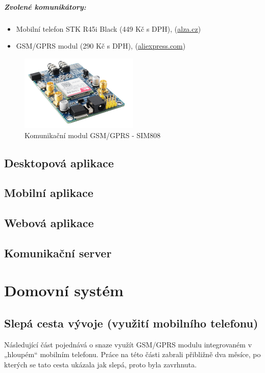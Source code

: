 \documentclass[FM,DP]{tulthesis}  %
\begin{document}
\paragraph{Zvolené komunikátory:}
\begin{itemize}
\item Mobilní telefon STK R45i Black (449 Kč s DPH), (\url{alza.cz})
\item GSM/GPRS modul (290 Kč s DPH), (\url{aliexpress.com})
\end{itemize} 

\begin{figure}[H]
\begin{center}
\includegraphics[width=0.5\textwidth]{images/gprs.png}
\caption{Komunikační modul GSM/GPRS - SIM808}
\label{image}
\end{center}
\end{figure}

\section{Desktopová aplikace}

\section{Mobilní aplikace}

\section{Webová aplikace}

\section{Komunikační server}


\chapter{Domovní systém}

\section{Slepá cesta vývoje (využití mobilního telefonu)}
Následující část pojednává o snaze využít GSM/GPRS modulu integrovaném v „hloupém“ mobilním telefonu. Práce na této části zabrali přibližně dva měsíce, po kterých se tato cesta ukázala jak slepá, proto byla zavrhnuta.
\end{document}
